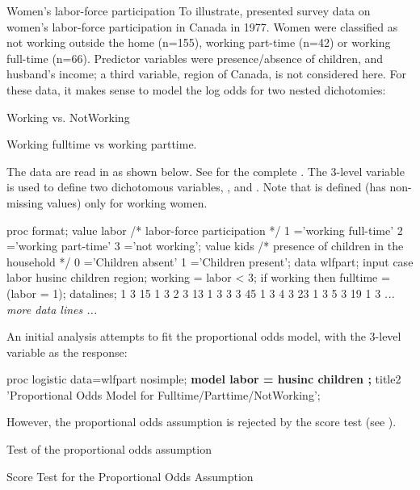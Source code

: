 \begin{Example}[wlfpart]{Women's labor-force participation}
To illustrate, \citet{Fox:84,Fox:97} presented survey data on women's labor-force
participation in Canada in 1977.  Women were classified as not working
outside the home (n=155), working part-time (n=42)  or working
full-time (n=66).  Predictor variables were presence/absence of
children, and husband's income; a third variable, region of Canada,
is not considered here.  For these data, it makes sense to model the
log odds for two nested dichotomies:

\begin{itemize*}
\item Working vs. NotWorking
\item Working fulltime vs working parttime.
\end{itemize*}

The data are read in as shown below.
See  for the complete \Dset.  The 3-level variable
 is used to define two dichotomous variables, , and .  Note that  is defined
(has non-missing values) only for working women.

\begin{listing}
proc format;
   value labor    /* labor-force participation */
      1 ='working full-time'  2 ='working part-time'
      3 ='not working';
   value kids     /* presence of children in the household */
      0 ='Children absent'  1 ='Children present';
data wlfpart;
   input case labor husinc children region;
   working = labor < 3;
   if working then
      fulltime = (labor = 1);
datalines;
  1  3  15  1  3
  2  3  13  1  3
  3  3  45  1  3
  4  3  23  1  3
  5  3  19  1  3
  {\it ... more data lines ...}
\end{listing}

An initial analysis attempts to fit the proportional odds model, with
the 3-level  variable as the response:

\begin{listing}
proc logistic data=wlfpart nosimple;
   {\bf model labor  = husinc children ;}
   title2 'Proportional Odds Model for Fulltime/Parttime/NotWorking';
\end{listing}

However, the proportional odds assumption is rejected by the score
test (see ).

\begin{Output}[htb]
\caption{Test of the proportional odds assumption}\label{out:wlfpart.1}
\small
\begin{output}
          Score Test for the Proportional Odds Assumption


\end{output}
\end{Output}
\end{Example}
